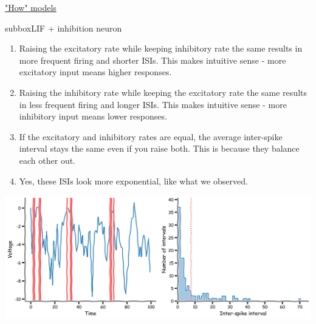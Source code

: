 \begin{textbox}{\href{https://compneuro.neuromatch.io/tutorials/W1D1_ModelTypes/student/W1D1_Tutorial2.html}{"How" models } }

\begin{subbox}{subbox}{LIF + inhibition neuron}
\scriptsize

\begin{enumerate}
    \item 
Raising the excitatory rate while keeping inhibitory rate the same results in
more frequent firing and shorter ISIs. This makes intuitive sense - more excitatory input
means higher responses.
\item Raising the inhibitory rate while keeping the excitatory rate the same results
in less frequent firing and longer ISIs. This makes intuitive sense - more inhibitory input
means lower responses.
\item If the excitatory and inhibitory rates are equal, the average inter-spike interval
stays the same even if you raise both. This is because they balance each other out.
\item Yes, these ISIs look more exponential, like what we observed.
\end{enumerate}

\begin{center}
    
\includegraphics[scale=0.1]{Figures/MT/MT_Figure6.png}
\end{center}


\end{subbox}
\end{textbox}
